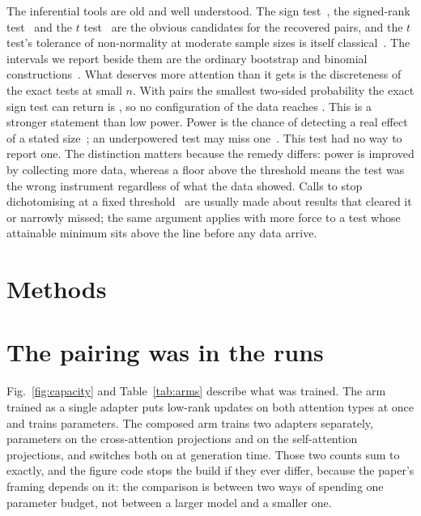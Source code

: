 The inferential tools are old and well understood. The sign
test~\cite{dixon1946sign}, the signed-rank test~\cite{wilcoxon1945individual}
and the $t$ test~\cite{student1908probable} are the obvious candidates for the
recovered pairs, and the $t$ test's tolerance of non-normality at moderate
sample sizes is itself classical~\cite{box1953nonnormality}. The intervals we
report beside them are the ordinary bootstrap and binomial
constructions~\cite{efron1979bootstrap,clopper1934use}. What deserves more
attention than it gets is the discreteness of the exact tests at small $n$. With
\NPairs{} pairs the smallest two-sided probability the exact sign test can
return is \FloorAtFour{}, so no configuration of the data reaches \Alpha{}. This
is a stronger statement than low power. Power is the chance of detecting a real
effect of a stated size~\cite{cohen1992power}; an underpowered test may miss
one~\cite{button2013power}. This test had no way to report one. The
distinction matters because the remedy differs: power is improved by collecting
more data, whereas a floor above the threshold means the test was the wrong
instrument regardless of what the data showed. Calls to stop dichotomising at a
fixed threshold~\cite{amrhein2019retire,wasserstein2016asa} are usually made
about results that cleared it or narrowly missed; the same argument applies with
more force to a test whose attainable minimum sits above the line before any
data arrive.

\section{Methods}


\section{The pairing was in the runs}

Fig.~\ref{fig:capacity} and Table~\ref{tab:arms} describe what was trained.
The arm trained as a single adapter puts low-rank updates on both attention
types at once and trains \JointParams{} parameters. The composed arm trains
two adapters separately, \CrossParams{} parameters on the cross-attention
projections and \SelfParams{} on the self-attention projections, and switches
both on at generation time. Those two counts sum to \JointParams{} exactly, and
the figure code stops the build if they ever differ, because the paper's
framing depends on it: the comparison is between two ways of spending one
parameter budget, not between a larger model and a smaller one.

